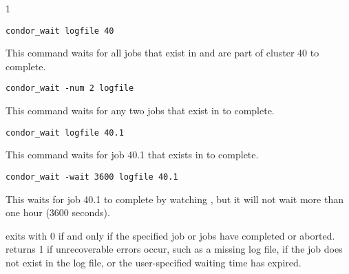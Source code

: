 \begin{ManPage}{\label{man-condor-wait}}{1}
\begin{verbatim}
condor_wait logfile 40
\end{verbatim}
This command waits for all jobs that exist in  and are part
of cluster 40 to complete.

\begin{verbatim}
condor_wait -num 2 logfile
\end{verbatim}
This command waits for any two jobs that exist in  to
complete.

\begin{verbatim}
condor_wait logfile 40.1
\end{verbatim}
This command waits for job 40.1 that exists in  to
complete.

\begin{verbatim}
condor_wait -wait 3600 logfile 40.1
\end{verbatim}
This waits for job 40.1 to
complete by watching , but it will not wait more than one
hour (3600 seconds).

\ExitStatus

 exits with 0 if and only if the specified job or jobs
have completed or
aborted.  returns 1 if unrecoverable errors occur, such
as a missing log file, if the job does not exist in the log file, or
the user-specified waiting time has expired.

\end{ManPage}
